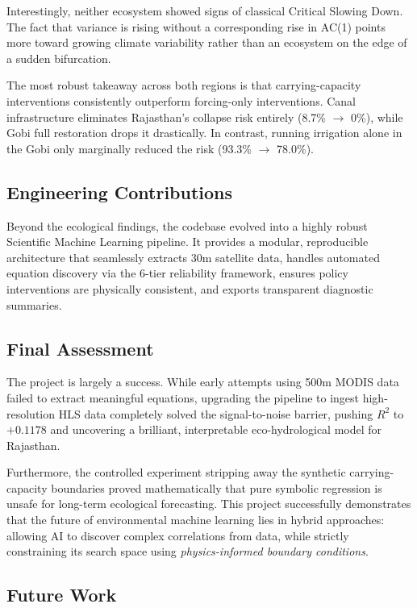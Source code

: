\documentclass[12pt, a4paper]{article}
\begin{document}
Interestingly, neither ecosystem showed signs of classical Critical Slowing Down. The fact that variance is rising without a corresponding rise in AC(1) points more toward growing climate variability rather than an ecosystem on the edge of a sudden bifurcation.

The most robust takeaway across both regions is that carrying-capacity interventions consistently outperform forcing-only interventions. Canal infrastructure eliminates Rajasthan's collapse risk entirely (8.7\% $\to$ 0\%), while Gobi full restoration drops it drastically. In contrast, running irrigation alone in the Gobi only marginally reduced the risk (93.3\% $\to$ 78.0\%).

\subsection{Engineering Contributions}

Beyond the ecological findings, the codebase evolved into a highly robust Scientific Machine Learning pipeline. It provides a modular, reproducible architecture that seamlessly extracts 30m satellite data, handles automated equation discovery via the 6-tier reliability framework, ensures policy interventions are physically consistent, and exports transparent diagnostic summaries.

\subsection{Final Assessment}

The project is largely a success. While early attempts using 500m MODIS data failed to extract meaningful equations, upgrading the pipeline to ingest high-resolution HLS data completely solved the signal-to-noise barrier, pushing $R^2$ to $+0.1178$ and uncovering a brilliant, interpretable eco-hydrological model for Rajasthan. 

Furthermore, the controlled experiment stripping away the synthetic carrying-capacity boundaries proved mathematically that pure symbolic regression is unsafe for long-term ecological forecasting. This project successfully demonstrates that the future of environmental machine learning lies in hybrid approaches: allowing AI to discover complex correlations from data, while strictly constraining its search space using \emph{physics-informed boundary conditions}.

\subsection{Future Work}
\end{document}

